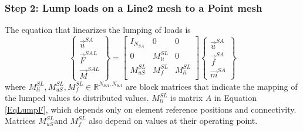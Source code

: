 \documentclass[10pt,letterpaper,oneside,notitlepage]{article}
\begin{document}
\subsubsection{Step 2: Lump loads on a Line2 mesh to a Point mesh}
The equation that linearizes the lumping of loads is
\begin{equation}
\label{Lump}
   \left\{   \begin{matrix} \vec{u}^{SA} \\ \vec{F}^{SAL} \\ \vec{M}^{SAL} \end{matrix} \right\} 
=
   \begin{bmatrix}
    I_{\mathit{N_{SA}}}   & 0 \         & 0   \\
    0                     & M_{li}^{SL} & 0   \\
    M_{uS}^{SL}           & M_{f}^{SL}  & M_{li}^{SL} \\
   \end{bmatrix}
   \left\{   \begin{matrix} \vec{u}^{SA} \\ \vec{f}^{SA} \\ \vec{m}^{SA} \end{matrix} \right\} 
\end{equation}
where $M_{li}^{SL}, M_{uS}^{SL}, M_{f}^{SL} \in \mathbb{R}^{ \mathit{N_{SA}},\mathit{N_{SA}}}$ are block matrices that indicate the mapping of the lumped values to distributed values. $M_{li}^{SL}$ is matrix $A$ in Equation \ref{EqLumpF}, which depends only on element reference positions and connectivity. Matrices $M_{uS}^{SL}$and $M_{f}^{SL}$ also depend on values at their operating point.
\end{document}
